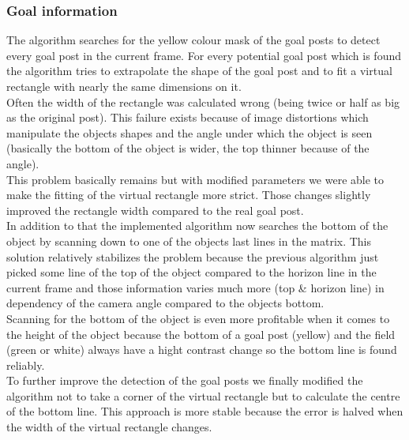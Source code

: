 \documentclass[lnicst,a4paper]{svmultln}
\begin{document}
\subsubsection{Goal information}
The algorithm searches for the yellow colour mask of the goal posts to detect every goal post in the current frame. For every potential goal post which is found the algorithm tries to extrapolate the shape of the goal post and to fit a virtual rectangle with nearly the same dimensions on it.
\\
Often the width of the rectangle was calculated wrong (being twice or half as big as the original post). This failure exists because of image distortions which manipulate the objects shapes and the angle under which the object is seen (basically the bottom of the object is wider, the top thinner because of the angle).
\\
This problem basically remains but with modified parameters we were able to make the fitting of the virtual rectangle more strict. Those changes slightly improved the rectangle width compared to the real goal post.
\\
In addition to that the implemented algorithm now searches the bottom of the object by scanning down to one of the objects last lines in the matrix. This solution relatively stabilizes the problem because the previous algorithm just picked some line of the top of the object compared to the horizon line in the current frame and those information varies much more (top \& horizon line) in dependency of the camera angle compared to the objects bottom.
\\
Scanning for the bottom of the object is even more profitable when it comes to the height of the object because the bottom of a goal post (yellow) and the field (green or white) always have a hight contrast change so the bottom line is found reliably.
\\
To further improve the detection of the goal posts we finally modified the algorithm not to take a corner of the virtual rectangle but to calculate the centre of the bottom line. This approach is more stable because the error is halved when the width of the virtual rectangle changes.
\end{document}

